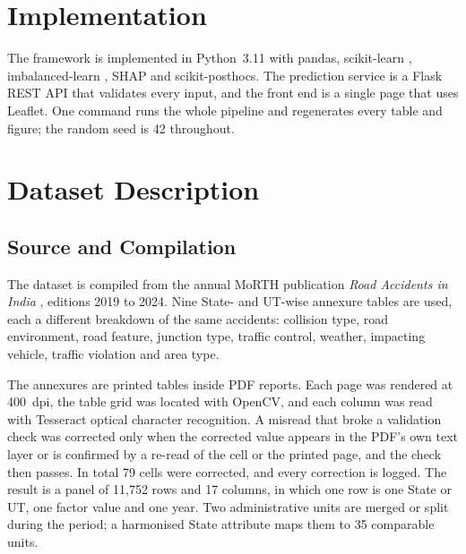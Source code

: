 \documentclass[conference]{IEEEtran}
\begin{document}
\section{Implementation}
\label{sec:implementation}

The framework is implemented in Python~3.11 with pandas, scikit-learn \cite{pedregosa2011}, imbalanced-learn \cite{lemaitre2017}, SHAP \cite{lundberg2017} and scikit-posthocs. The prediction service is a Flask REST API that validates every input, and the front end is a single page that uses Leaflet. One command runs the whole pipeline and regenerates every table and figure; the random seed is 42 throughout.

\section{Dataset Description}
\label{sec:dataset}

\subsection{Source and Compilation}
The dataset is compiled from the annual MoRTH publication \emph{Road Accidents in India} \cite{morth2022,morthseries}, editions 2019 to 2024. Nine State- and UT-wise annexure tables are used, each a different breakdown of the same accidents: collision type, road environment, road feature, junction type, traffic control, weather, impacting vehicle, traffic violation and area type.

The annexures are printed tables inside PDF reports. Each page was rendered at 400~dpi, the table grid was located with OpenCV, and each column was read with Tesseract optical character recognition. A misread that broke a validation check was corrected only when the corrected value appears in the PDF's own text layer or is confirmed by a re-read of the cell or the printed page, and the check then passes. In total 79 cells were corrected, and every correction is logged. The result is a panel of 11,752 rows and 17 columns, in which one row is one State or UT, one factor value and one year. Two administrative units are merged or split during the period; a harmonised State attribute maps them to 35 comparable units.
\end{document}
